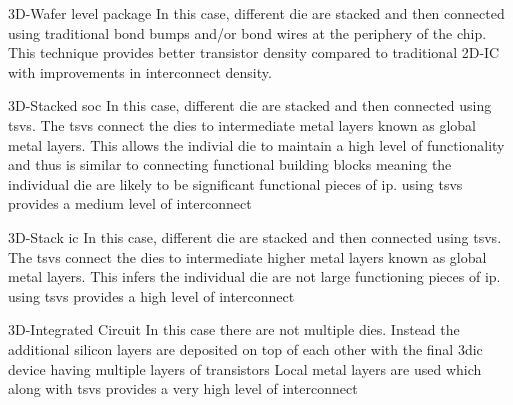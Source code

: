 \begin{outline}

  \1 3D-Wafer level package \cite{itrs2015_interconn}
    \2 In this case, different die are stacked and then connected using traditional bond bumps and/or bond wires at the periphery of the chip.
    \2 This technique provides better transistor density compared to traditional 2D-IC with improvements in interconnect density.

  \1 3D-Stacked \ac{soc} \cite{itrs2015_interconn}
    \2 In this case, different die are stacked and then connected using \acp{tsv}. The \acp{tsv} connect the dies to intermediate metal layers known as global metal layers. This allows the indivial die to maintain a high level of functionality and thus is similar to connecting functional building blocks meaning the individual die are likely to be significant functional pieces of \ac{ip}.
    \2 using \acp{tsv} provides a medium level of interconnect

  \1 3D-Stack \ac{ic} \cite{itrs2015_interconn}
    \2 In this case, different die are stacked and then connected using \acp{tsv}. The \acp{tsv} connect the dies to intermediate higher metal layers known as global metal layers. This infers the individual die are not large functioning pieces of \ac{ip}.
    \2 using \acp{tsv} provides a high level of interconnect

  \1 3D-Integrated Circuit \cite{itrs2015_interconn}
    \2 In this case there are not multiple dies. Instead the additional silicon layers are deposited on top of each other with the final \ac{3dic} device having multiple layers of transistors
    \2 Local metal layers are used which along with \acp{tsv} provides a very high level of interconnect
\end{outline}

